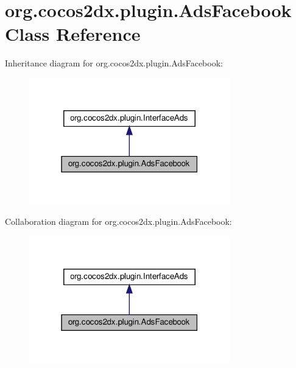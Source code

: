 \hypertarget{classorg_1_1cocos2dx_1_1plugin_1_1AdsFacebook}{}\section{org.\+cocos2dx.\+plugin.\+Ads\+Facebook Class Reference}
\label{classorg_1_1cocos2dx_1_1plugin_1_1AdsFacebook}


Inheritance diagram for org.\+cocos2dx.\+plugin.\+Ads\+Facebook\+:
\nopagebreak
\begin{figure}[H]
\begin{center}
\leavevmode
\includegraphics[width=247pt]{classorg_1_1cocos2dx_1_1plugin_1_1AdsFacebook__inherit__graph}
\end{center}
\end{figure}


Collaboration diagram for org.\+cocos2dx.\+plugin.\+Ads\+Facebook\+:
\nopagebreak
\begin{figure}[H]
\begin{center}
\leavevmode
\includegraphics[width=247pt]{classorg_1_1cocos2dx_1_1plugin_1_1AdsFacebook__coll__graph}
\end{center}
\end{figure}
